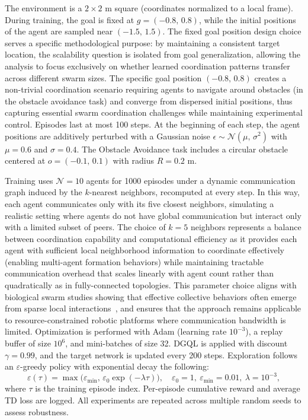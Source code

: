 The environment is a \(2 \times 2\) m square (coordinates normalized to a local frame). 
%
During training, 
 the goal is fixed at \(g = (-0.8,\,0.8)\), while the initial positions of the agent are sampled near \((-1.5,\,1.5)\). 
%
The fixed goal position design choice serves a specific methodological purpose: 
 by maintaining a consistent target location, 
 the scalability question is isolated from goal generalization, 
 allowing the analysis to focus exclusively 
 on whether learned coordination patterns transfer across different swarm sizes.
%
The specific goal position \((-0.8,\,0.8)\) creates a non-trivial coordination scenario requiring agents 
 to navigate around obstacles  (in the obstacle avoidance task) 
 and converge from dispersed initial positions, 
 thus capturing essential swarm coordination challenges while maintaining experimental control.
%
Episodes last at most 100 steps. 
%
At the beginning of each step,
 the agent positions are additively perturbed with a 
 Gaussian noise \(\epsilon \sim \mathcal{N}(\mu,\,\sigma^2)\) with \(\mu=0.6\) and \(\sigma=0.4\). 
%
The Obstacle Avoidance task includes a circular obstacle centered at \(o = (-0.1,\,0.1)\) with radius \(R = 0.2\) m.

Training uses \(\mathcal{N}=10\) agents for 1000 episodes under a dynamic communication graph induced 
 by the \(k\)-nearest neighbors, recomputed at every step. 
%
In this way, 
 each agent communicates only with its five closest neighbors, 
 simulating a realistic setting where agents do not have global communication 
 but interact only with a limited subset of peers.
%
The choice of \(k=5\) neighbors represents a balance between coordination capability and computational efficiency as 
 it provides each agent with sufficient local neighborhood information 
 to coordinate effectively (enabling multi-agent formation behaviors) 
 while maintaining tractable communication overhead 
 that scales linearly with agent count rather than quadratically as in fully-connected topologies.
%
This parameter choice aligns with biological swarm studies showing 
 that effective collective behaviors often emerge from sparse local interactions~\cite{DBLP:conf/siggraph/Reynolds87}, 
 and ensures that the approach remains applicable 
 to resource-constrained robotic platforms where communication bandwidth is limited.
%
Optimization is performed with Adam (learning rate \(10^{-3}\)), 
 a replay buffer of size \(10^6\), and mini-batches of size 32. 
%
DGQL is applied with discount \(\gamma=0.99\), and the target network is updated every 200 steps. 
%
Exploration follows an \(\varepsilon\)-greedy policy with exponential decay the following:
\begin{equation}
\varepsilon(\tau) = \max\!\big(\varepsilon_{\min},\, \varepsilon_0 \exp(-\lambda \tau)\big),
\quad \varepsilon_0=1,\ \varepsilon_{\min}=0.01,\ \lambda=10^{-3},
\end{equation}
where \(\tau\) is the training episode index.
%
Per-episode cumulative reward and average TD loss are logged. 
% 
All experiments are repeated across multiple random seeds to assess robustness.

